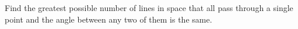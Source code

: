Find the greatest possible number of lines in space that all pass through a single point and the angle between any two of them is the same.